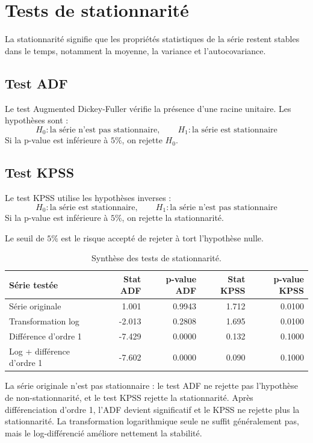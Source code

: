 \documentclass[12pt,a4paper]{report}
\begin{document}
\section{Tests de stationnarité}
La stationnarité signifie que les propriétés statistiques de la série restent stables dans le temps, notamment la moyenne, la variance et l'autocovariance.

\subsection{Test ADF}
Le test Augmented Dickey-Fuller vérifie la présence d'une racine unitaire. Les hypothèses sont :
\[
H_0 : \text{la série n'est pas stationnaire}, \qquad H_1 : \text{la série est stationnaire}
\]
Si la p-value est inférieure à $5\%$, on rejette $H_0$.

\subsection{Test KPSS}
Le test KPSS utilise les hypothèses inverses :
\[
H_0 : \text{la série est stationnaire}, \qquad H_1 : \text{la série n'est pas stationnaire}
\]
Si la p-value est inférieure à $5\%$, on rejette la stationnarité.

Le seuil de $5\%$ est le risque accepté de rejeter à tort l'hypothèse nulle.

\begin{table}[H]
\centering
\begin{tabular}{lrrrr}
\toprule
Série testée & Stat ADF & p-value ADF & Stat KPSS & p-value KPSS \\
\midrule
Série originale & 1.001 & 0.9943 & 1.712 & 0.0100 \\
Transformation log & -2.013 & 0.2808 & 1.695 & 0.0100 \\
Différence d'ordre 1 & -7.429 & 0.0000 & 0.132 & 0.1000 \\
Log + différence d'ordre 1 & -7.602 & 0.0000 & 0.090 & 0.1000 \\
\bottomrule
\end{tabular}
\caption{Synthèse des tests de stationnarité.}
\end{table}

La série originale n'est pas stationnaire : le test ADF ne rejette pas l'hypothèse de non-stationnarité, et le test KPSS rejette la stationnarité. Après différenciation d'ordre 1, l'ADF devient significatif et le KPSS ne rejette plus la stationnarité. La transformation logarithmique seule ne suffit généralement pas, mais le log-différencié améliore nettement la stabilité.
\end{document}
